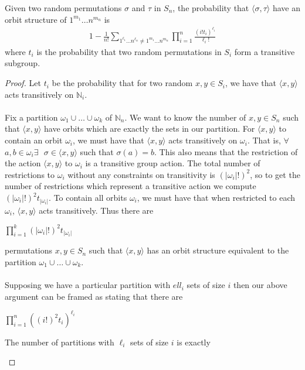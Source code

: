 \begin{theorem}
	Given two random permutations $\sigma$ and $\tau$ in $S_n$, the probability that $\langle\sigma, \tau\rangle$ have an orbit structure of $1^{m_1}\dots n^{m_n}$ is
	\begin{align*}
		1-\frac{1}{n!}\sum_{1^{\ell_1}\dots n^{\ell_n} \ne 1^{m_1}\dots n^{m_n}}\prod_{i=1}^n{\frac{(i!t_{i})^{\ell_i}}{\ell_i!}}
	\end{align*}
	where $t_i$ is the probability that two random permutations in $S_i$ form a transitive subgroup.
\end{theorem}
\begin{proof}
	Let $t_i$ be the probability that for two random $x,y\in S_i$, we have that $\langle x,y\rangle$ acts transitively on $\mathbb{N}_i$.
	\\\\Fix a partition $\omega_1\cup\dots\cup\omega_k$ of $\mathbb{N}_n$. We want to know the number of $x,y\in S_n$ such that $\langle x,y\rangle$ have orbits which are exactly the sets in our partition. For $\langle x, y\rangle$ to contain an orbit $\omega_i$, we must have that $\langle x,y\rangle$ acts transitively on $\omega_i$. That is, $\forall$ $a,b\in\omega_i$\text{ }$\exists\text{ }\sigma\in\langle x,y\rangle$ such that $\sigma(a) = b$. This also means that the restriction of the action $\langle x,y\rangle$ to $\omega_i$ is a transitive group action.  The total number of restrictions to $\omega_i$ without any constraints on transitivity is $(|\omega_i|!)^2$, so to get the number of restrictions which represent a transitive action we compute $(|\omega_i|!)^2t_{|\omega_i|}$. To contain all orbits $\omega_i$, we must have that when restricted to each $\omega_i$, $\langle x,y\rangle$ acts transitively. Thus there are
	\begin{center}
		$\prod_{i=1}^k(|\omega_i|!)^2t_{|\omega_i|}$
	\end{center}
	permutations $x,y\in S_n$ such that $\langle x,y\rangle$ has an orbit structure equivalent to the partition $\omega_1\cup\dots\cup\omega_k$.
	\\\\Supposing we have a particular partition with $ell_i$ sets of size $i$ then our above argument can be framed as stating that there are
	\begin{center}
		$\prod_{i=1}^n{((i!)^2t_i)^{\ell_i}}$
	\end{center}
	The number of partitions with $\ell_i$ sets of size $i$ is exactly
	\begin{center}

\end{center}
\end{proof}
